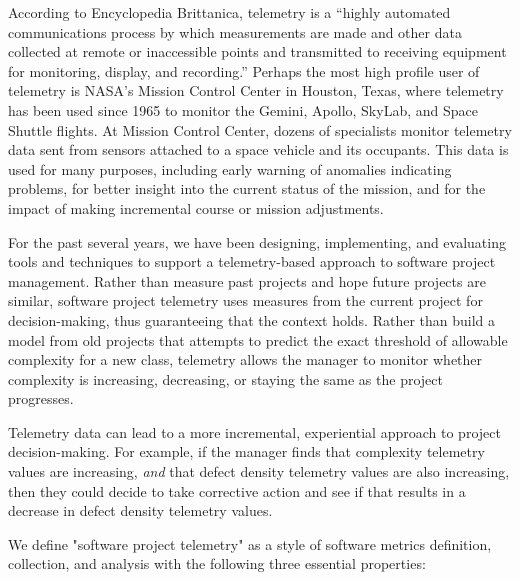 \documentclass[11pt,twocolumn]{article}
\begin{document}

According to Encyclopedia Brittanica, telemetry is a ``highly automated
communications process by which measurements are made and other data
collected at remote or inaccessible points and transmitted to receiving
equipment for monitoring, display, and recording.''  Perhaps the most high
profile user of telemetry is NASA's Mission Control Center in Houston,
Texas, where telemetry has been used since 1965 to monitor the Gemini,
Apollo, SkyLab, and Space Shuttle flights.  At Mission Control Center,
dozens of specialists monitor telemetry data sent from sensors attached to
a space vehicle and its occupants.  This data is used for many purposes,
including early warning of anomalies indicating problems, for better
insight into the current status of the mission, and for the impact of
making incremental course or mission adjustments.

For the past several years, we have been designing, implementing, and
evaluating tools and techniques to support a telemetry-based approach to
software project management. Rather than measure past projects and hope
future projects are similar, software project telemetry uses measures from
the current project for decision-making, thus guaranteeing that the context
holds.  Rather than build a model from old projects that attempts to
predict the exact threshold of allowable complexity for a new class,
telemetry allows the manager to monitor whether complexity is increasing,
decreasing, or staying the same as the project progresses.  

Telemetry data can lead to a more incremental, experiential approach to
project decision-making. For example, if the manager finds that complexity
telemetry values are increasing, {\em and} that defect density telemetry
values are also increasing, then they could decide to take corrective
action and see if that results in a decrease in defect density telemetry
values.     


We define "software project telemetry" as a style of software metrics
definition, collection, and analysis with the following three essential
properties:
\end{document}
